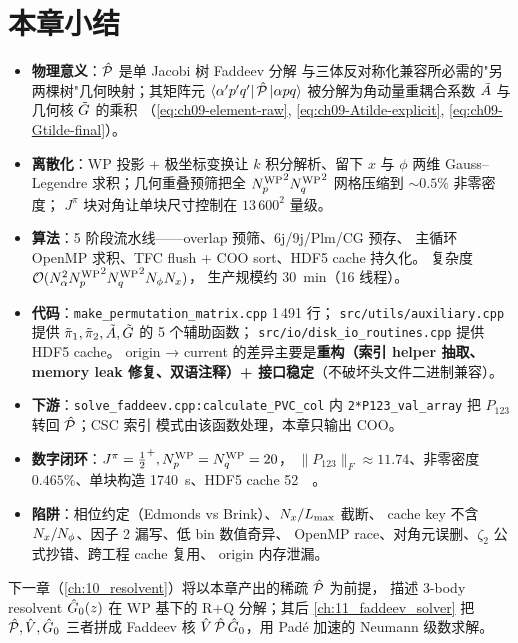 \section{本章小结}
\label{sec:ch09-summary}

\begin{itemize}
\item \textbf{物理意义}：\(\hat{\mathcal{P}}\) 是单 Jacobi 树 Faddeev 分解
      与三体反对称化兼容所必需的"另两棵树"几何映射；其矩阵元
      \(\bra{\alpha'p'q'}\hat{\mathcal{P}}\ket{\alpha pq}\)
      被分解为角动量重耦合系数 \(\tilde{A}\) 与几何核 \(\tilde{G}\) 的乘积
      （\eqref{eq:ch09-element-raw}, \eqref{eq:ch09-Atilde-explicit},
      \eqref{eq:ch09-Gtilde-final}）。
\item \textbf{离散化}：WP 投影 + 极坐标变换让 \(k\) 积分解析、留下
      \(x\) 与 \(\phi\) 两维 Gauss--Legendre 求积；几何重叠预筛把全
      \({N_{p}^{\text{WP}}}^2{N_{q}^{\text{WP}}}^2\) 网格压缩到 \(\sim 0.5\%\) 非零密度；
      \(J^\pi\) 块对角让单块尺寸控制在 \(13\,600^2\) 量级。
\item \textbf{算法}：5 阶段流水线——overlap 预筛、6j/9j/Plm/CG 预存、
      主循环 OpenMP 求积、TFC flush + COO sort、HDF5 cache 持久化。
      复杂度 \(\mathcal{O}(N_\alpha^2{N_{p}^{\text{WP}}}^2{N_{q}^{\text{WP}}}^2N_{\phi}N_{x})\)，
      生产规模约 \SI{30}{\minute}（16 线程）。
\item \textbf{代码}：\texttt{make\_permutation\_matrix.cpp} 1\,491 行；
      \texttt{src/utils/auxiliary.cpp} 提供 \(\tilde{\pi}_{1}, \tilde{\pi}_{2},
      \tilde{A}, \tilde{G}\) 的 5 个辅助函数；
      \texttt{src/io/disk\_io\_routines.cpp} 提供 HDF5 cache。
      origin → current 的差异主要是\textbf{重构（索引 helper 抽取、
      memory leak 修复、双语注释）+ 接口稳定}（不破坏头文件二进制兼容）。
\item \textbf{下游}：\texttt{solve\_faddeev.cpp:calculate\_PVC\_col} 内
      \verb|2*P123_val_array| 把 \(P_{123}\) 转回 \(\hat{\mathcal{P}}\)；CSC 索引
      模式由该函数处理，本章只输出 COO。
\item \textbf{数字闭环}：\(J^\pi=\tfrac{1}{2}^+, {N_{p}^{\text{WP}}}={N_{q}^{\text{WP}}}=20\)，
      \(\|P_{123}\|_F \approx 11.74\)、非零密度 \(0.465\%\)、单块构造
      \SI{1740}{\second}、HDF5 cache \SI{52}{\mega\byte}。
\item \textbf{陷阱}：相位约定（Edmonds vs Brink）、\(N_{x}/L_{\max}\) 截断、
      cache key 不含 \(N_{x}/N_{\phi}\)、因子 2 漏写、低 bin 数值奇异、
      OpenMP race、对角元误删、\(\zeta_2\) 公式抄错、跨工程 cache 复用、
      origin 内存泄漏。
\end{itemize}

下一章（\cref{ch:10_resolvent}）将以本章产出的稀疏 \(\hat{\mathcal{P}}\) 为前提，
描述 3-body resolvent \(\hat{G}_0(z)\) 在 WP 基下的 R+Q 分解；其后
\cref{ch:11_faddeev_solver} 把 \(\hat{\mathcal{P}}, \hat{V}, \hat{G}_0\) 三者拼成 Faddeev
核 \(\hat{V}\,\hat{\mathcal{P}}\,\hat{G}_0\)，用 Padé 加速的 Neumann 级数求解。
